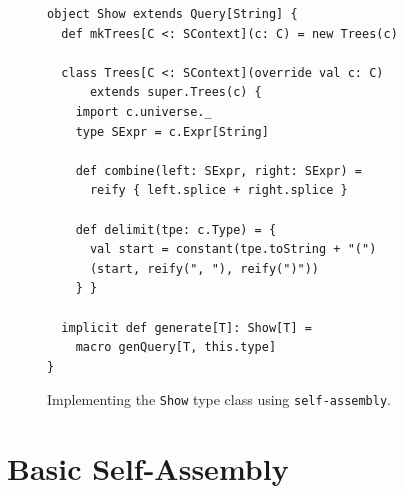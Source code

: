 \documentclass[preprint,nocopyrightspace]{sigplanconf}
\newcommand{\sselfassembly}{\texttt{self-assembly}}
\begin{document}




\begin{figure}
\centering
\begin{lstlisting}
object Show extends Query[String] {
  def mkTrees[C <: SContext](c: C) = new Trees(c)

  class Trees[C <: SContext](override val c: C)
      extends super.Trees(c) {
    import c.universe._
    type SExpr = c.Expr[String]

    def combine(left: SExpr, right: SExpr) =
      reify { left.splice + right.splice }

    def delimit(tpe: c.Type) = {
      val start = constant(tpe.toString + "(")
      (start, reify(", "), reify(")"))
    } }

  implicit def generate[T]: Show[T] =
    macro genQuery[T, this.type]
}
\end{lstlisting}
  \caption{Implementing the \lstinline{Show} type class using \sselfassembly.}
  \label{fig:basic-usage}
\end{figure}

\section{Basic Self-Assembly}
\label{sec:basic-self-assembly}

\end{document}
